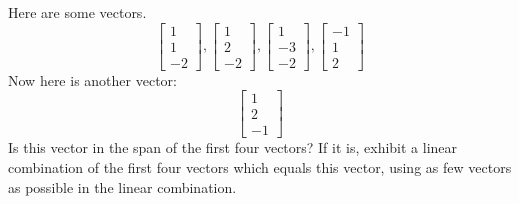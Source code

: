 \documentclass{ximera}
\begin{document}
\begin{problem}\label{prb:3.8} Here are some vectors.
\begin{equation*}
\left[
\begin{array}{r}
1 \\
1 \\
-2
\end{array}
\right] ,\left[
\begin{array}{r}
1 \\
2 \\
-2
\end{array}
\right] ,\left[
\begin{array}{r}
1 \\
-3 \\
-2
\end{array}
\right] ,\left[
\begin{array}{r}
-1 \\
1 \\
2
\end{array}
\right]
\end{equation*}
Now here is another vector:\
\begin{equation*}
\left[
\begin{array}{r}
1 \\
2 \\
-1
\end{array}
\right]
\end{equation*}
Is this vector in the span of the first four vectors? If it is, exhibit a
linear combination of the first four vectors which equals this vector, using
as few vectors as possible in the linear combination.
\end{problem}
\end{document}
